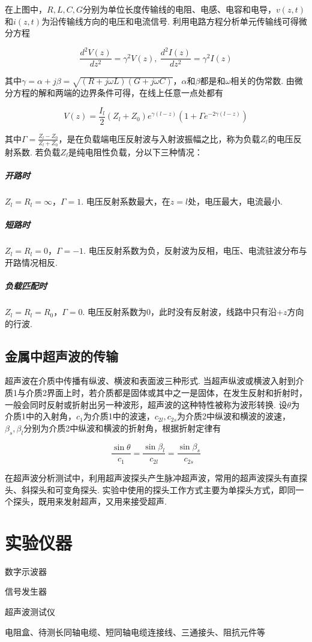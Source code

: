 \documentclass{thureport}
\begin{document}
在上图中，$R,L,C,G$分别为单位长度传输线的电阻、电感、电容和电导，$v(z,t)$和$i(z,t)$为沿传输线方向的电压和电流信号. 利用电路方程分析单元传输线可得微分方程

$$\frac{d^2V(z)}{dz^2}=\gamma^2V(z),\ \frac{d^2I(z)}{dz^2}=\gamma^2I(z)$$

其中$\gamma=\alpha+j\beta=\sqrt{(R+j\omega L)(G+j\omega C)}$，$\alpha$和$\beta$都是和$\omega$相关的伪常数. 由微分方程的解和两端的边界条件可得，在线上任意一点处都有

$$V(z)=\frac{I_l}{2}(Z_l+Z_0)e^{\gamma(l-z)}(1+\Gamma e^{-2\gamma(l-z)})$$

其中$\Gamma=\frac{Z_l-Z_0}{Z_l+Z_0}$，是在负载端电压反射波与入射波振幅之比，称为负载$Z_l$的电压反射系数. 若负载$Z_l$是纯电阻性负载，分以下三种情况：

\subparagraph{开路时}$Z_l=R_l=\infty$，$\Gamma=1$. 电压反射系数最大，在$z=l$处，电压最大，电流最小.

\subparagraph{短路时}$Z_l=R_l=0$，$\Gamma=-1$. 电压反射系数为负，反射波为反相，电压、电流驻波分布与开路情况相反.

\subparagraph{负载匹配时}$Z_l=R_l=R_0$，$\Gamma=0$. 电压反射系数为0，此时没有反射波，线路中只有沿$+z$方向的行波.

\subsection{金属中超声波的传输}
超声波在介质中传播有纵波、横波和表面波三种形式. 当超声纵波或横波入射到介质1与介质2界面上时，若介质都是固体或其中之一是固体，在发生反射和折射时，一般会同时反射或折射出另一种波形，超声波的这种特性被称为波形转换. 设$\theta$为介质1中的入射角，$c_1$为介质1中的波速，$c_{2l},c_{2s}$为介质2中纵波和横波的波速，$\beta_s,\beta_l$分别为介质2中纵波和横波的折射角，根据折射定律有

$$\frac{\sin\theta}{c_1}=\frac{\sin\beta_l}{c_{2l}}=\frac{\sin\beta_s}{c_{2s}}$$

在超声波分析测试中，利用超声波探头产生脉冲超声波，常用的超声波探头有直探头、斜探头和可变角探头. 实验中使用的探头工作方式主要为单探头方式，即同一个探头，既用来发射超声，又用来接受超声.

\section{实验仪器}
\begin{clause}
	\item 数字示波器
	\item 信号发生器
	\item 超声波测试仪
	\item 电阻盒、待测长同轴电缆、短同轴电缆连接线、三通接头、阻抗元件等
\end{clause}
\end{document}
